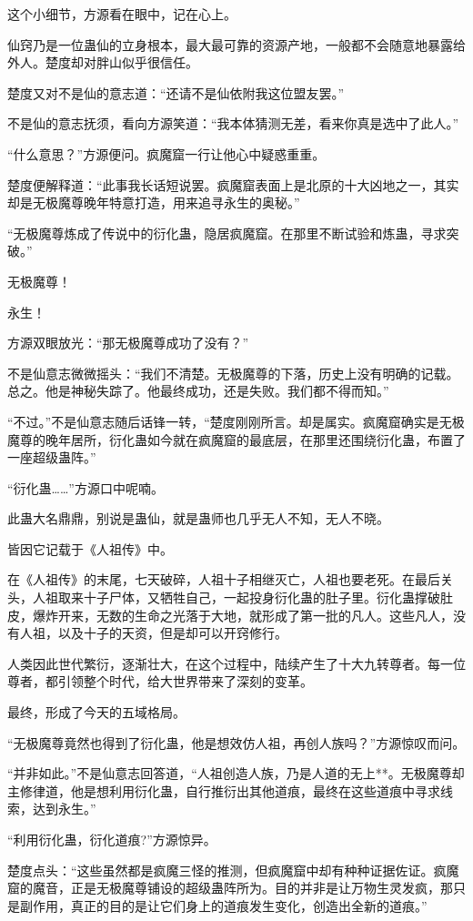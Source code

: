 \begin{this_body}
这个小细节，方源看在眼中，记在心上。

仙窍乃是一位蛊仙的立身根本，最大最可靠的资源产地，一般都不会随意地暴露给外人。楚度却对胖山似乎很信任。

楚度又对不是仙的意志道：“还请不是仙依附我这位盟友罢。”

不是仙的意志抚须，看向方源笑道：“我本体猜测无差，看来你真是选中了此人。”

“什么意思？”方源便问。疯魔窟一行让他心中疑惑重重。

楚度便解释道：“此事我长话短说罢。疯魔窟表面上是北原的十大凶地之一，其实却是无极魔尊晚年特意打造，用来追寻永生的奥秘。”

“无极魔尊炼成了传说中的衍化蛊，隐居疯魔窟。在那里不断试验和炼蛊，寻求突破。”

无极魔尊！

永生！

方源双眼放光：“那无极魔尊成功了没有？”

不是仙意志微微摇头：“我们不清楚。无极魔尊的下落，历史上没有明确的记载。总之。他是神秘失踪了。他最终成功，还是失败。我们都不得而知。”

“不过。”不是仙意志随后话锋一转，“楚度刚刚所言。却是属实。疯魔窟确实是无极魔尊的晚年居所，衍化蛊如今就在疯魔窟的最底层，在那里还围绕衍化蛊，布置了一座超级蛊阵。”

“衍化蛊……”方源口中呢喃。

此蛊大名鼎鼎，别说是蛊仙，就是蛊师也几乎无人不知，无人不晓。

皆因它记载于《人祖传》中。

在《人祖传》的末尾，七天破碎，人祖十子相继灭亡，人祖也要老死。在最后关头，人祖取来十子尸体，又牺牲自己，一起投身衍化蛊的肚子里。衍化蛊撑破肚皮，爆炸开来，无数的生命之光落于大地，就形成了第一批的凡人。这些凡人，没有人祖，以及十子的天资，但是却可以开窍修行。

人类因此世代繁衍，逐渐壮大，在这个过程中，陆续产生了十大九转尊者。每一位尊者，都引领整个时代，给大世界带来了深刻的变革。

最终，形成了今天的五域格局。

“无极魔尊竟然也得到了衍化蛊，他是想效仿人祖，再创人族吗？”方源惊叹而问。

“并非如此。”不是仙意志回答道，“人祖创造人族，乃是人道的无上**。无极魔尊却主修律道，他是想利用衍化蛊，自行推衍出其他道痕，最终在这些道痕中寻求线索，达到永生。”

“利用衍化蛊，衍化道痕?”方源惊异。

楚度点头：“这些虽然都是疯魔三怪的推测，但疯魔窟中却有种种证据佐证。疯魔窟的魔音，正是无极魔尊铺设的超级蛊阵所为。目的并非是让万物生灵发疯，那只是副作用，真正的目的是让它们身上的道痕发生变化，创造出全新的道痕。”


\end{this_body}
